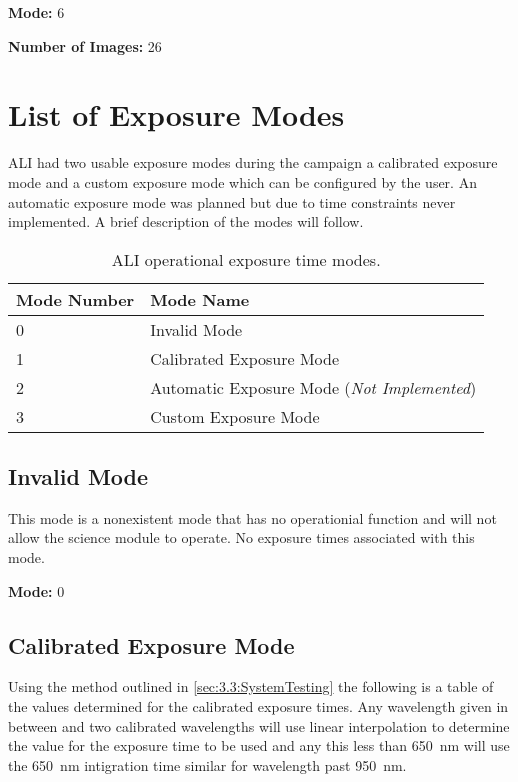 \textbf{Mode:} 6

\textbf{Number of Images:} 26

\section{List of Exposure Modes}
\label{sec:B.3:ExposureModes}

ALI had two usable exposure modes during the campaign a calibrated exposure mode and a custom exposure mode which can be configured by the user. An automatic exposure mode was planned but due to time constraints never implemented. A brief description of the modes will follow.

\begin{table}
    \begin{center}
    \begin{tabular}{|l|l|}
    \hline
    Mode Number & Mode Name \\
    \hline
    0 & Invalid Mode \\
    \hline
    1 & Calibrated Exposure Mode \\
    \hline
    2 & Automatic Exposure Mode (\textit{Not Implemented}) \\
    \hline
    3 & Custom Exposure Mode \\
    \hline
    \end{tabular}
    \end{center}
    \caption[ALI Operational Exposure Time Modes]{ALI operational exposure time modes.}
    \label{tab:B.3:ExposureModes}
\end{table}

\subsection{Invalid Mode}

This mode is a nonexistent mode that has no operationial function and will not allow the science module to operate. No exposure times associated with this mode.

\textbf{Mode:} 0

\subsection{Calibrated Exposure Mode}

Using the method outlined in \autoref{sec:3.3:SystemTesting} the following is a table of the values determined for the calibrated exposure times. Any wavelength given in between and two calibrated wavelengths will use linear interpolation to determine the value for the exposure time to be used and any this less than 650~nm will use the 650~nm intigration time similar for wavelength past 950~nm.

